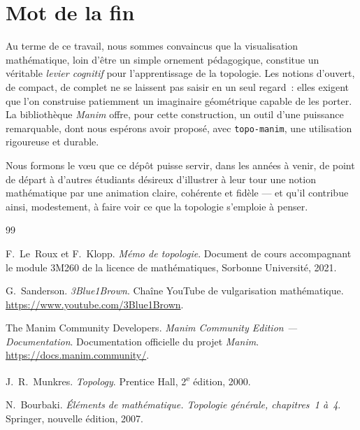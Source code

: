 \documentclass[12pt, a4paper, openany]{report}
\begin{document}
	\section{Mot de la fin}

	Au terme de ce travail, nous sommes convaincus que la visualisation mathématique, loin d’être un simple ornement pédagogique, constitue un véritable \emph{levier cognitif} pour l’apprentissage de la topologie. Les notions d’ouvert, de compact, de complet ne se laissent pas saisir en un seul regard~: elles exigent que l’on construise patiemment un imaginaire géométrique capable de les porter. La bibliothèque \textit{Manim} offre, pour cette construction, un outil d’une puissance remarquable, dont nous espérons avoir proposé, avec \texttt{topo-manim}, une utilisation rigoureuse et durable.

	Nous formons le vœu que ce dépôt puisse servir, dans les années à venir, de point de départ à d’autres étudiants désireux d’illustrer à leur tour une notion mathématique par une animation claire, cohérente et fidèle — et qu’il contribue ainsi, modestement, à faire voir ce que la topologie s’emploie à penser.
	
	\begin{thebibliography}{99}

		F.~Le~Roux et F.~Klopp.
		\textit{Mémo de topologie}.
		Document de cours accompagnant le module 3M260 de la licence de mathématiques, Sorbonne Université, 2021.

		G.~Sanderson.
		\textit{3Blue1Brown}.
		Chaîne YouTube de vulgarisation mathématique. \url{https://www.youtube.com/3Blue1Brown}.

		The Manim Community Developers.
		\textit{Manim Community Edition --- Documentation}.
		Documentation officielle du projet \textit{Manim}. \url{https://docs.manim.community/}.

		J.~R.~Munkres.
		\textit{Topology}.
		Prentice Hall, 2\textsuperscript{e} édition, 2000.

		N.~Bourbaki.
		\textit{Éléments de mathématique. Topologie générale, chapitres~1 à~4}.
		Springer, nouvelle édition, 2007.
	\end{thebibliography}
	
\end{document}
